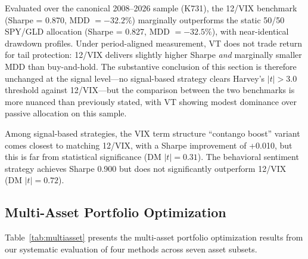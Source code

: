 \documentclass[12pt,a4paper]{article}
\begin{document}
Evaluated over the canonical 2008--2026 sample (K731), the 12/VIX benchmark (Sharpe = 0.870, MDD $= -32.2\%$) marginally outperforms the static 50/50 SPY/GLD allocation (Sharpe = 0.827, MDD $= -32.5\%$), with near-identical drawdown profiles. Under period-aligned measurement, VT does not trade return for tail protection: 12/VIX delivers slightly higher Sharpe \emph{and} marginally smaller MDD than buy-and-hold. The substantive conclusion of this section is therefore unchanged at the signal level---no signal-based strategy clears Harvey's $|t| > 3.0$ threshold against 12/VIX---but the comparison between the two benchmarks is more nuanced than previously stated, with VT showing modest dominance over passive allocation on this sample.

Among signal-based strategies, the VIX term structure ``contango boost'' variant comes closest to matching 12/VIX, with a Sharpe improvement of +0.010, but this is far from statistical significance (DM $|t| = 0.31$). The behavioral sentiment strategy achieves Sharpe 0.900 but does not significantly outperform 12/VIX (DM $|t| = 0.72$).

\subsection{Multi-Asset Portfolio Optimization}

Table~\ref{tab:multiasset} presents the multi-asset portfolio optimization results from our systematic evaluation of four methods across seven asset subsets.
\end{document}
